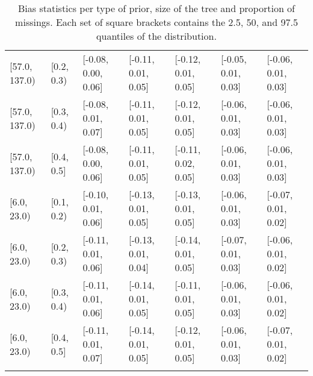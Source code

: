 \begin{table}[ht]
\begin{tabular}{lllllll}
  {[57.0, 137.0)} & {[0.2, 0.3)} & {[-0.08, 0.00, 0.06]} & {[-0.11, 0.01, 0.05]} & {[-0.12, 0.01, 0.05]} & {[-0.05, 0.01, 0.03]} & {[-0.06, 0.01, 0.03]} \\ 
  {[57.0, 137.0)} & {[0.3, 0.4)} & {[-0.08, 0.01, 0.07]} & {[-0.11, 0.01, 0.05]} & {[-0.12, 0.01, 0.05]} & {[-0.06, 0.01, 0.03]} & {[-0.06, 0.01, 0.03]} \\ 
  {[57.0, 137.0)} & {[0.4, 0.5]} & {[-0.08, 0.00, 0.06]} & {[-0.11, 0.01, 0.05]} & {[-0.11, 0.02, 0.05]} & {[-0.06, 0.01, 0.03]} & {[-0.06, 0.01, 0.03]} \\ 
  {[6.0, 23.0)} & {[0.1, 0.2)} & {[-0.10, 0.01, 0.06]} & {[-0.13, 0.01, 0.05]} & {[-0.13, 0.01, 0.05]} & {[-0.06, 0.01, 0.03]} & {[-0.07, 0.01, 0.02]} \\ 
  {[6.0, 23.0)} & {[0.2, 0.3)} & {[-0.11, 0.01, 0.06]} & {[-0.13, 0.01, 0.04]} & {[-0.14, 0.01, 0.05]} & {[-0.07, 0.01, 0.03]} & {[-0.06, 0.01, 0.02]} \\ 
  {[6.0, 23.0)} & {[0.3, 0.4)} & {[-0.11, 0.01, 0.06]} & {[-0.14, 0.01, 0.05]} & {[-0.11, 0.01, 0.05]} & {[-0.06, 0.01, 0.03]} & {[-0.06, 0.01, 0.02]} \\ 
  {[6.0, 23.0)} & {[0.4, 0.5]} & {[-0.11, 0.01, 0.07]} & {[-0.14, 0.01, 0.05]} & {[-0.12, 0.01, 0.05]} & {[-0.06, 0.01, 0.03]} & {[-0.07, 0.01, 0.02]} \\ 
   \bottomrule
\multicolumn{7}{l}{}\\
\end{tabular}
\caption{Bias statistics per type of prior, size of the tree and proportion of missings. Each set of square brackets contains the 2.5, 50, and 97.5 quantiles of the distribution.} 
\label{tab:bias-prior-size-missigness}
\end{table}
